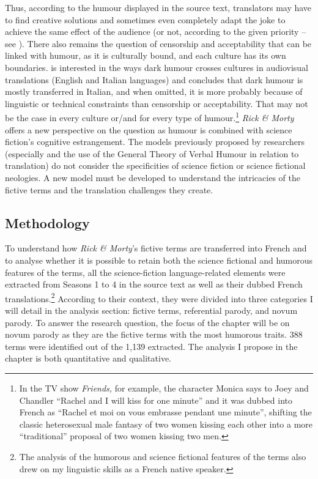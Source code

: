 \documentclass[output=paper]{langscibook}
\begin{document}
Thus, according to the humour displayed in the source text, translators may have to find creative solutions and sometimes even completely adapt the joke to achieve the same effect of the audience (or not, according to the given priority – see \citealt{Zabalbeascoa1996}). There also remains the question of censorship and acceptability that can be linked with humour, as it is culturally bound, and each culture has its own boundaries. \citet{Bucaria2008} is interested in the ways dark humour crosses cultures in audiovisual translations (English and Italian languages) and concludes that dark humour is mostly transferred in Italian, and when omitted, it is more probably because of linguistic or technical constraints than censorship or acceptability. That may not be the case in every culture or/and for every type of humour.\footnote{In the TV show \textit{Friends,} for example, the character Monica says to Joey and Chandler “Rachel and I will kiss for one minute” and it was dubbed into French as “Rachel et moi on vous embrasse pendant une minute”, shifting the classic heterosexual male fantasy of two women kissing each other into a more “traditional” proposal of two women kissing two men.}  \textit{Rick \& Morty} offers a new perspective on the question as humour is combined with science fiction’s cognitive estrangement. The models previously proposed by researchers (especially \citealt{Attardo2002} and the use of the General Theory of Verbal Humour in relation to translation) do not consider the specificities of science fiction or science fictional neologies. A new model must be developed to understand the intricacies of the fictive terms and the translation challenges they create.

\subsection{Methodology}

To understand how \textit{Rick \& Morty}’s fictive terms are transferred into French and to analyse whether it is possible to retain both the science fictional and humorous features of the terms, all the science-fiction language-related elements were extracted from Seasons 1 to 4 in the source text as well as their dubbed French translations.\footnote{The analysis of the humorous and science fictional features of the terms also drew on my linguistic skills as a French native speaker.} According to their context, they were divided into three categories I will detail in the analysis section: fictive terms, referential parody, and novum parody. To answer the research question, the focus of the chapter will be on novum parody as they are the fictive terms with the most humorous traits. 388 terms were identified out of the 1,139 extracted. The analysis I propose in the chapter is both quantitative and qualitative.
\end{document}
